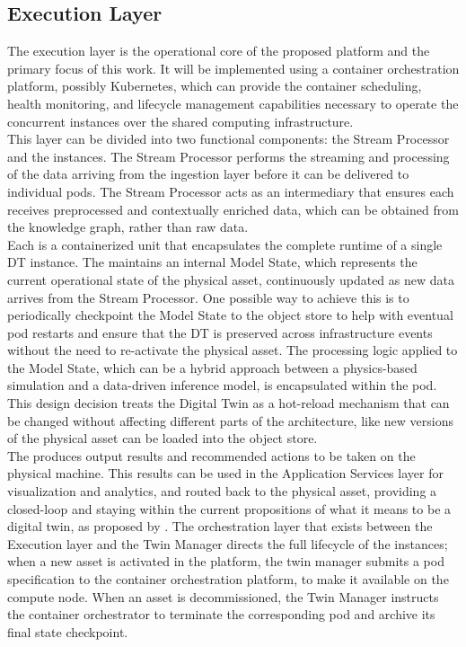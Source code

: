 \subsection{Execution Layer}
\label{sec:executin_layer}
The execution layer is the operational core of the proposed platform and the primary focus of this work. It will be implemented using a container orchestration platform, possibly Kubernetes, which can provide the container scheduling, health monitoring, and lifecycle management capabilities necessary to operate the concurrent \DTPods instances over the shared computing infrastructure.\\
This layer can be divided into two functional components: the Stream Processor and the \DTPod instances. The Stream Processor performs the streaming and processing of the data arriving from the ingestion layer before it can be delivered to individual pods. The Stream Processor acts as an intermediary that ensures each \DTPod receives preprocessed and contextually enriched data, which can be obtained from the knowledge graph, rather than raw data.\\
Each \DTPod is a containerized unit that encapsulates the complete runtime of a single DT instance. The \DTPod maintains an internal Model State, which represents the current operational state of the physical asset, continuously updated as new data arrives from the Stream Processor. One possible way to achieve this is to periodically checkpoint the Model State to the object store to help with eventual pod restarts and ensure that the DT is preserved across infrastructure events without the need to re-activate the physical asset. The processing logic applied to the Model State, which can be a hybrid approach between a physics-based simulation and a data-driven inference model, is encapsulated within the pod. This design decision treats the Digital Twin as a hot-reload mechanism that can be changed without affecting different parts of the architecture, like new versions of the physical asset can be loaded into the object store.\\
The \DTPod produces output results and recommended actions to be taken on the physical machine. This results can be used in the Application Services layer for visualization and analytics, and routed back to the physical asset, providing a closed-loop and staying within the current propositions of what it means to be a digital twin, as proposed by \cite{Kritzinger2018}. The orchestration layer that exists between the Execution layer and the Twin Manager directs the full lifecycle of the \DTPod instances; when a new asset is activated in the platform, the twin manager submits a pod specification to the container orchestration platform, to make it available on the compute node. When an asset is decommissioned, the Twin Manager instructs the container orchestrator to terminate the corresponding pod and archive its final state checkpoint.

